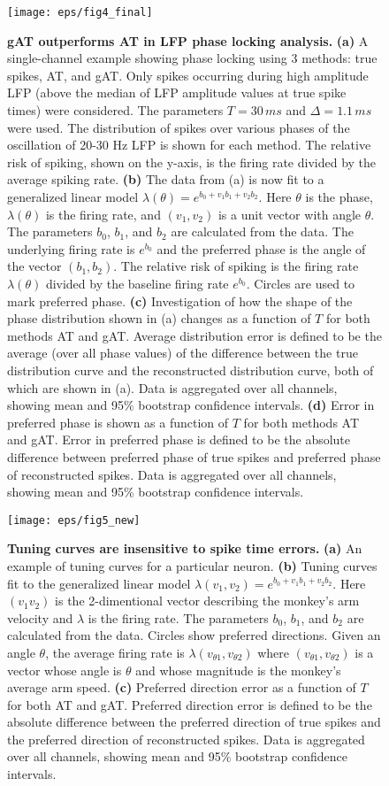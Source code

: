 \documentclass[journal]{IEEEtran}
\begin{document}
\begin{figure}[!t]
\centering
\texttt{[image: eps/fig4\_final]}
\caption{{\bf gAT outperforms AT in LFP phase locking analysis.} {\bf (a)} A single-channel example showing phase locking using 3 methods: true spikes, AT, and gAT. Only spikes occurring during high amplitude LFP (above the median of LFP amplitude values at true spike times) were considered. The parameters $T = 30\,ms$ and $\Delta = 1.1\,ms$ were used. The distribution of spikes over various phases of the oscillation of 20-30 Hz LFP is shown for each method. The relative risk of spiking, shown on the y-axis, is the firing rate divided by the average spiking rate. {\bf (b)} The data from (a) is now fit to a generalized linear model $\lambda(\theta) = e^{b_0 + v_1 b_1 + v_2 b_2}$. Here $\theta$ is the phase, $\lambda(\theta)$ is the firing rate, and $(v_1, v_2)$ is a unit vector with angle $\theta$. The parameters $b_0$, $b_1$, and $b_2$ are calculated from the data. The underlying firing rate is $e^{b_0}$ and the preferred phase is the angle of the vector $(b_1, b_2)$. The relative risk of spiking is the firing rate $\lambda(\theta)$ divided by the baseline firing rate $e^{b_0}$. Circles are used to mark preferred phase. {\bf (c)} Investigation of how the shape of the phase distribution shown in (a) changes as a function of $T$ for both methods AT and gAT. Average distribution error is defined to be the average (over all phase values) of the difference between the true distribution curve and the reconstructed distribution curve, both of which are shown in (a). Data is aggregated over all channels, showing mean and 95\% bootstrap confidence intervals. {\bf (d)} Error in preferred phase is shown as a function of $T$ for both methods AT and gAT. Error in preferred phase is defined to be the absolute difference between preferred phase of true spikes and preferred phase of reconstructed spikes. Data is aggregated over all channels, showing mean and 95\% bootstrap confidence intervals.}
\label{fig:LFP}
\end{figure}

\begin{figure}[!t]
\centering
\texttt{[image: eps/fig5\_new]}
\caption{{\bf Tuning curves are insensitive to spike time errors.} {\bf (a)} An example of tuning curves for a particular neuron. {\bf (b)} Tuning curves fit to the generalized linear model $\lambda(v_1, v_2) = e^{b_0 + v_1 b_1 + v_2 b_2}$. Here $(v_1 v_2)$ is the 2-dimentional vector describing the monkey's arm velocity and $\lambda$ is the firing rate. The parameters $b_0$, $b_1$, and $b_2$ are calculated from the data. Circles show preferred directions. Given an angle $\theta$, the average firing rate is $\lambda(v_{\theta 1}, v_{\theta 2})$ where $(v_{\theta 1}, v_{\theta 2})$ is a vector whose angle is $\theta$ and whose magnitude is the monkey's average arm speed. {\bf (c)} Preferred direction error as a function of $T$ for both AT and gAT. Preferred direction error is defined to be the absolute difference between the preferred direction of true spikes and the preferred direction of reconstructed spikes. Data is aggregated over all channels, showing mean and 95\% bootstrap confidence intervals.}
\label{fig:tuning}
\end{figure}
\end{document}
